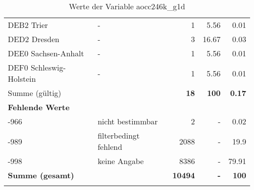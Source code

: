 \begin{longtable}{Xlrrr}
     \multicolumn{1}{X}{DEB2 Trier} &
     - &
     \num{1} &
     \num[round-mode=places,round-precision=2]{5.56} &
     \num[round-mode=places,round-precision=2]{0.01} \\

     \multicolumn{1}{X}{DED2 Dresden} &
     - &
     \num{3} &
     \num[round-mode=places,round-precision=2]{16.67} &
     \num[round-mode=places,round-precision=2]{0.03} \\

     \multicolumn{1}{X}{DEE0 Sachsen-Anhalt} &
     - &
     \num{1} &
     \num[round-mode=places,round-precision=2]{5.56} &
     \num[round-mode=places,round-precision=2]{0.01} \\

     \multicolumn{1}{X}{DEF0 Schleswig-Holstein} &
     - &
     \num{1} &
     \num[round-mode=places,round-precision=2]{5.56} &
     \num[round-mode=places,round-precision=2]{0.01} \\
     \midrule
      \multicolumn{2}{l}{Summe (gültig)} & \textbf{\num{18}} &
      \textbf{\num{100}} &
         \textbf{\num[round-mode=places,round-precision=2]{0.17}} \\
     \multicolumn{5}{l}{\textbf{Fehlende Werte}}\\
       -966 & nicht bestimmbar & \num{2} & - & \num[round-mode=places,round-precision=2]{0.02} \\

       -989 & filterbedingt fehlend & \num{2088} & - & \num[round-mode=places,round-precision=2]{19.9} \\

       -998 & keine Angabe & \num{8386} & - & \num[round-mode=places,round-precision=2]{79.91} \\

     \midrule
     \multicolumn{2}{l}{\textbf{Summe (gesamt)}} & \textbf{\num{10494}} & \textbf{-} & \textbf{\num{100}} \\
     \bottomrule
     \caption{Werte der Variable aocc246k\_g1d}
     \end{longtable}
     
